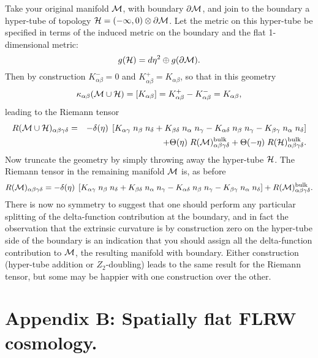 \documentclass[a4paper,12pt]{article}
\begin{document}
Take your original manifold ${\mathcal M}$, with boundary $\partial{\mathcal M}$, and join
to the boundary a hyper-tube of topology ${\mathcal H} = (-\infty,0) \otimes
\partial{\mathcal M}$. Let the metric on this hyper-tube be specified in terms
of the induced metric on the boundary and the flat 1-dimensional metric:
%
\begin{equation}
g({\mathcal H}) = d\eta^2 \oplus g(\partial{\mathcal M}).
\end{equation}
%
Then by construction $K^-_{\alpha\beta} =0$ and $K^+_{\alpha\beta} =
K_{\alpha\beta}$, so that in this geometry
%
\begin{equation}
\kappa_{\alpha\beta}({\mathcal M}\cup{\mathcal H}) = [K_{\alpha\beta}] = 
K^+_{\alpha\beta} - K^-_{\alpha\beta} =  K_{\alpha\beta},
\end{equation}
%
leading to the Riemann tensor~\cite{Book} 
%
\begin{eqnarray}
R({\mathcal M}\cup{\mathcal H})_{\alpha\beta\gamma\delta} &=& 
- \delta(\eta) \; \left[
K_{\alpha\gamma} \; n_\beta \; n_\delta + 
K_{\beta\delta} \; n_\alpha \; n_\gamma -
K_{\alpha\delta} \; n_\beta \; n_\gamma -
K_{\beta\gamma} \; n_\alpha \; n_\delta
\right] 
\nonumber\\
&&
+\Theta(\eta) \; R({\mathcal M})^{\mathrm{bulk}}_{\alpha\beta\gamma\delta}
+\Theta(-\eta) \; R({\mathcal H})^{\mathrm{bulk}}_{\alpha\beta\gamma\delta}.
\end{eqnarray}
%
Now truncate the geometry by simply throwing away the hyper-tube ${\mathcal H}$.
The Riemann tensor in the remaining manifold ${\mathcal M}$ is, as before
%
\begin{equation}
R({\mathcal M})_{\alpha\beta\gamma\delta} = 
- \delta(\eta) \; \left[
K_{\alpha\gamma} \; n_\beta \; n_\delta + 
K_{\beta\delta} \; n_\alpha \; n_\gamma -
K_{\alpha\delta} \; n_\beta \; n_\gamma -
K_{\beta\gamma} \; n_\alpha \; n_\delta
\right] +
R({\mathcal M})^{\mathrm{bulk}}_{\alpha\beta\gamma\delta}.
\end{equation}
%
There is now no symmetry to suggest that one should perform any
particular splitting of the delta-function contribution at the
boundary, and in fact the observation that the extrinsic curvature is
by construction zero on the hyper-tube side of the boundary is an
indication that you should assign all the delta-function contribution
to ${\mathcal M}$, the resulting manifold with boundary. Either construction
(hyper-tube addition or $Z_2$-doubling) leads to the same result for
the Riemann tensor, but some may be happier with one construction over
the other.


\section*{Appendix B: Spatially flat FLRW cosmology.}
\end{document}
